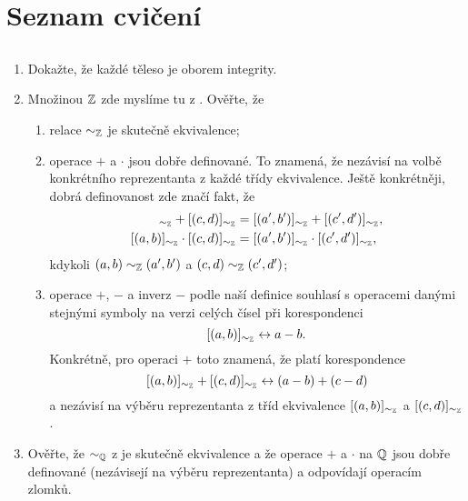 \chapter*{Seznam cvičení}

\section*{}

\begin{enumerate}
 \item Dokažte, že každé těleso je oborem integrity.
 \item Množinou $\mathbb{Z}$ zde myslíme tu z . Ověřte,
  že
  \begin{enumerate}
  \item relace $ \sim _{\mathbb{Z}}$ je skutečně ekvivalence;
  \item operace $+$ a $ \cdot $ jsou dobře definované. To znamená, že nezávisí
   na volbě konkrétního reprezentanta z každé třídy ekvivalence. Ještě
   konkrétněji, dobrá definovanost zde značí fakt, že
   \begin{align*}
    [(a,b)]_{ \sim_{\Z}} + [(c,d)]_{ \sim _{\Z}} &= [(a',b')]_{ \sim _{\Z}} +
    [(c',d')]_{ \sim _{\Z}},\\
    [(a,b)]_{ \sim_{\Z}} \cdot [(c,d)]_{ \sim _{\Z}} &= [(a',b')]_{ \sim _{\Z}}
    \cdot [(c',d')]_{ \sim _{\Z}},
   \end{align*}
   kdykoli $(a,b) \sim _{\mathbb{Z}} (a',b')$ a $(c,d) \sim _{\mathbb{Z}} (c',d')$;
  \item operace $+$, $-$ a inverz $-$ podle naší definice souhlasí s operacemi
   danými stejnými symboly na  verzi celých čísel při korespondenci
   \[
    [(a,b)]_{ \sim_{\mathbb{Z}}} \leftrightarrow a - b.
   \]
   Konkrétně, pro operaci $+$ toto znamená, že platí korespondence
   \[
    [(a,b)]_{ \sim_{\mathbb{Z}}} + [(c,d)]_{ \sim _{\mathbb{Z}}} \leftrightarrow (a - b) + (c -
    d)
   \]
   a nezávisí na výběru reprezentanta z tříd ekvivalence $[(a,b)]_{ \sim _{\mathbb{Z}}}$
   a $[(c,d)]_{ \sim_{\mathbb{Z}}}$.
 \end{enumerate}
 \item Ověřte, že $ \sim _{\mathbb{Q}}$ z  je
  skutečně ekvivalence a že operace $+$ a $ \cdot $ na $\mathbb{Q}$ jsou dobře
  definované (nezávisejí na výběru reprezentanta) a odpovídají 
  operacím zlomků.
\end{enumerate}


